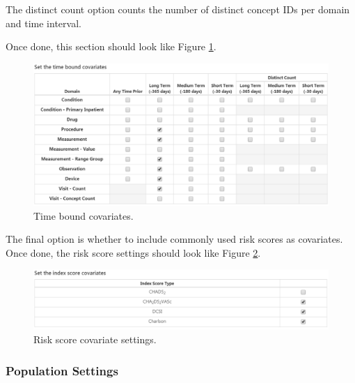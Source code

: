 \documentclass[11pt]{book}
\theoremstyle{definition}
\theoremstyle{definition}
\theoremstyle{definition}
\theoremstyle{remark}
\begin{document}
The distinct count option counts the number of distinct concept IDs per domain and time interval.

Once done, this section should look like Figure \ref{fig:covariateSettings5}.

\begin{figure}

{\centering \includegraphics[width=1\linewidth]{images/PatientLevelPrediction/covariateSettings5} 

}

\caption{Time bound covariates.}\label{fig:covariateSettings5}
\end{figure}

The final option is whether to include commonly used risk scores as covariates. Once done, the risk score settings should look like Figure \ref{fig:covariateSettings6}.

\begin{figure}

{\centering \includegraphics[width=1\linewidth]{images/PatientLevelPrediction/covariateSettings6} 

}

\caption{Risk score covariate settings.}\label{fig:covariateSettings6}
\end{figure}

\hypertarget{population-settings}{%
\subsubsection*{Population Settings}\label{population-settings}}
\end{document}
